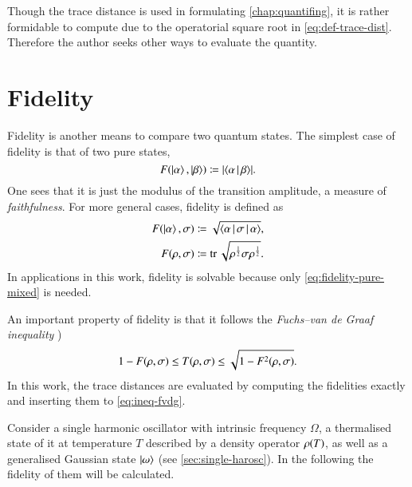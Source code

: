 Though the trace distance is used in formulating \cref{chap:quantifing}, it is 
rather formidable to compute due to the operatorial square root in 
\cref{eq:def-trace-dist}. Therefore the author seeks other ways to evaluate the 
quantity.

\section{Fidelity}
\label{sec:fidelity}

Fidelity is another means to compare two quantum states. The simplest case 
of fidelity is that of two pure states,
\begin{equation}
{F}\mathopen{}\left(\Ket{\alpha},\Ket{\beta}\right)\mathclose{} \coloneqq {\left|\Braket{\alpha | \beta }\right|}.
\end{equation}
One sees that it is just the modulus of the transition amplitude, a measure of 
\emph{faithfulness}. For more general cases, fidelity is defined as
\begin{align}
{F}\mathopen{}\left(\Ket{\alpha},{\sigma}\right)\mathclose{} &\coloneqq \sqrt{\Braket{\alpha | {\sigma} | 
\alpha}}, \\
\label{eq:fidelity-pure-mixed}
{F}\mathopen{}\left({\rho},{\sigma}\right)\mathclose{} &\coloneqq \operatorname{tr}\sqrt{{\rho}^\frac{1}{2} 
{\sigma} {\rho}^\frac{1}{2}}.
\end{align}
In applications in this work, fidelity is solvable because only
\cref{eq:fidelity-pure-mixed} is needed.

An important property of fidelity is that it follows the \emph{Fuchs--van de 
Graaf inequality} \cite{Fuchs1999})
\begin{equation}
1 - {F}\mathopen{}\left({\rho},{\sigma}\right)\mathclose{} \le {T}\mathopen{}\left({\rho},{\sigma}\right)\mathclose{}
\le \sqrt{1 - {F^2}\mathopen{}\left({\rho},{\sigma}\right)\mathclose{}}.
\label{eq:ineq-fvdg}
\end{equation}
In this work, the trace distances are evaluated by computing the fidelities 
exactly and inserting them to \cref{eq:ineq-fvdg}.

Consider a single harmonic oscillator with intrinsic frequency $\Omega$, a 
thermalised state of it at temperature $T$ described by a density operator 
${\rho}\mathopen{}\left(T\right)\mathclose{}$, as well as a generalised Gaussian state $\Ket{\omega}$ (see 
\cref{sec:single-harosc}). In the following the fidelity of them will be 
calculated.


